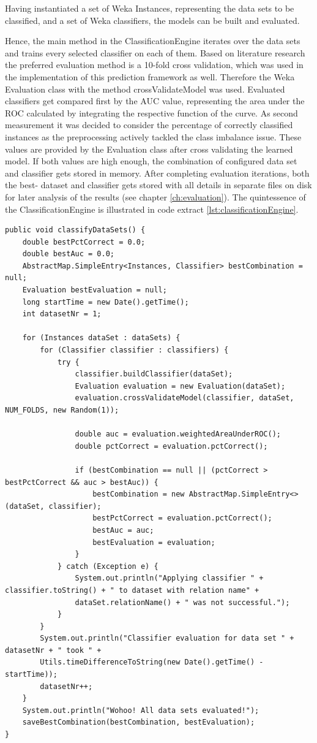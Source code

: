 Having instantiated a set of Weka Instances, representing the data sets to be classified, and a set of Weka classifiers, the models can be built and evaluated. 

Hence, the main method in the ClassificationEngine iterates over the data sets and trains every selected classifier on each of them. Based on literature research the preferred evaluation method is a 10-fold cross validation, which was used in the implementation of this prediction framework as well. Therefore the Weka Evaluation class with the method crossValidateModel was used. Evaluated classifiers get compared first by the AUC value, representing the area under the ROC calculated by integrating the respective function of the curve. As second measurement it was decided to consider the percentage of correctly classified instances as the preprocessing actively tackled the class imbalance issue. These values are provided by the Evaluation class after cross validating the learned model. If both values are high enough, the combination of configured data set and classifier gets stored in memory. After completing evaluation iterations, both the best- dataset and classifier gets stored with all details in separate files on disk for later analysis of the results (see chapter \ref{ch:evaluation}). The quintessence of the ClassificationEngine is illustrated in code extract \ref{lst:classificationEngine}. 

\begin{lstlisting}[caption={Applying configured classifiers on preprocessed data sets}, label={lst:classificationEngine}]
public void classifyDataSets() {
	double bestPctCorrect = 0.0;
	double bestAuc = 0.0;
	AbstractMap.SimpleEntry<Instances, Classifier> bestCombination = null;
	Evaluation bestEvaluation = null;
	long startTime = new Date().getTime();
	int datasetNr = 1;
	
	for (Instances dataSet : dataSets) {
		for (Classifier classifier : classifiers) {
			try {
				classifier.buildClassifier(dataSet);
				Evaluation evaluation = new Evaluation(dataSet);
				evaluation.crossValidateModel(classifier, dataSet, NUM_FOLDS, new Random(1));
	
				double auc = evaluation.weightedAreaUnderROC();
				double pctCorrect = evaluation.pctCorrect();
				
				if (bestCombination == null || (pctCorrect > bestPctCorrect && auc > bestAuc)) {
					bestCombination = new AbstractMap.SimpleEntry<>(dataSet, classifier);
					bestPctCorrect = evaluation.pctCorrect();
					bestAuc = auc;
					bestEvaluation = evaluation;
				}
			} catch (Exception e) {
				System.out.println("Applying classifier " + classifier.toString() + " to dataset with relation name" +
				dataSet.relationName() + " was not successful.");
			}
		}
		System.out.println("Classifier evaluation for data set " + datasetNr + " took " +
		Utils.timeDifferenceToString(new Date().getTime() - startTime));
		datasetNr++;
	}
	System.out.println("Wohoo! All data sets evaluated!");
	saveBestCombination(bestCombination, bestEvaluation);
}
\end{lstlisting}

